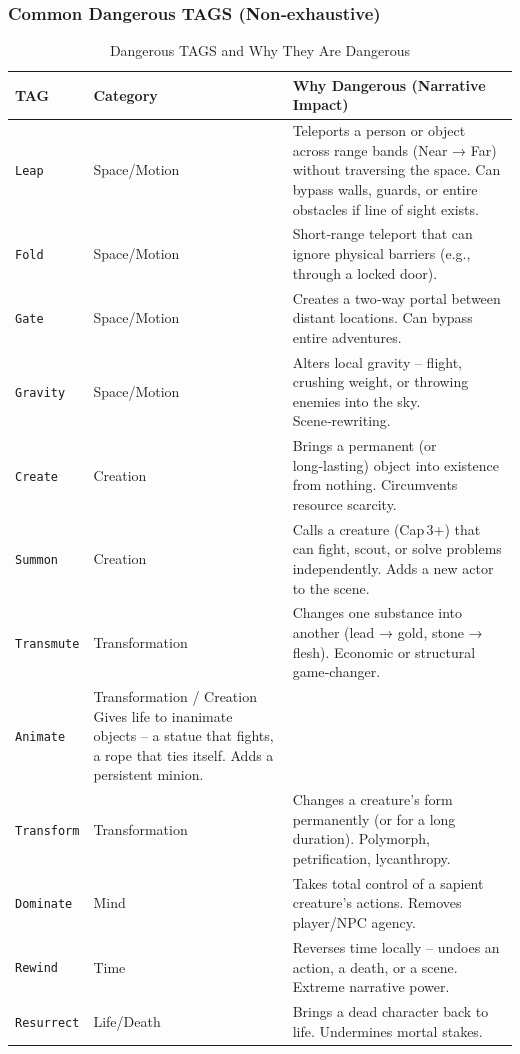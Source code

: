 \begin{tcolorbox}
\subsubsection*{Common Dangerous TAGS (Non‑exhaustive)}
\begin{longtable}{p{3cm} p{2.5cm} p{8.5cm}}
\caption{Dangerous TAGS and Why They Are Dangerous}\label{tab:dangerous-tags}\\
\toprule
\textbf{TAG} & \textbf{Category} & \textbf{Why Dangerous (Narrative Impact)} \\
\midrule
\texttt{Leap} & Space/Motion & Teleports a person or object across range bands (Near → Far) without traversing the space. Can bypass walls, guards, or entire obstacles if line of sight exists. \\
\texttt{Fold} & Space/Motion & Short‑range teleport that can ignore physical barriers (e.g., through a locked door). \\
\texttt{Gate} & Space/Motion & Creates a two‑way portal between distant locations. Can bypass entire adventures. \\
\texttt{Gravity} & Space/Motion & Alters local gravity – flight, crushing weight, or throwing enemies into the sky. Scene‑rewriting. \\
\texttt{Create} & Creation & Brings a permanent (or long‑lasting) object into existence from nothing. Circumvents resource scarcity. \\
\texttt{Summon} & Creation & Calls a creature (Cap 3+) that can fight, scout, or solve problems independently. Adds a new actor to the scene. \\
\texttt{Transmute} & Transformation & Changes one substance into another (lead → gold, stone → flesh). Economic or structural game‑changer. \\
\texttt{Animate} & Transformation / Creation Gives life to inanimate objects – a statue that fights, a rope that ties itself. Adds a persistent minion. \\
\texttt{Transform} & Transformation & Changes a creature’s form permanently (or for a long duration). Polymorph, petrification, lycanthropy. \\
\texttt{Dominate} & Mind & Takes total control of a sapient creature’s actions. Removes player/NPC agency. \\
\texttt{Rewind} & Time & Reverses time locally – undoes an action, a death, or a scene. Extreme narrative power. \\
\texttt{Resurrect} & Life/Death & Brings a dead character back to life. Undermines mortal stakes. \\
\bottomrule
\end{longtable}


\end{tcolorbox}
